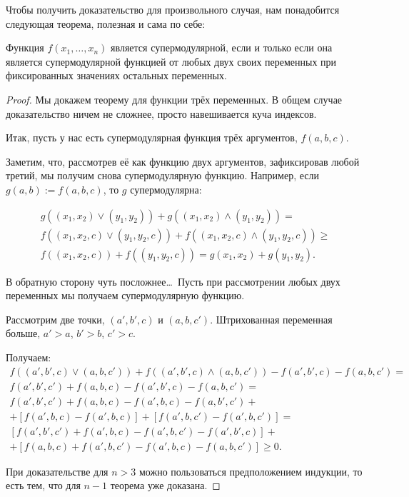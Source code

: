 Чтобы получить доказательство для произвольного случая, нам понадобится следующая теорема, полезная и сама по себе:
\begin{myth}
Функция $ f(x_{1},\ldots,x_{n}) $ является супермодулярной, если и только если она является супермодулярной функцией от любых двух своих переменных при фиксированных значениях остальных переменных.
\end{myth}

\begin{proof}

Мы докажем теорему для функции трёх переменных. В общем случае доказательство ничем не сложнее, просто навешивается куча индексов.

Итак, пусть у нас есть супермодулярная функция трёх аргументов, $ f(a,b,c) $.

Заметим, что, рассмотрев её как функцию двух аргументов, зафиксировав любой третий, мы получим снова супермодулярную функцию. Например, если $ g(a,b):=f(a,b,c) $, то $ g $ супермодулярна:

\begin{multline}
g((x_{1},x_{2})\vee (y_{1},y_{2}))+g((x_{1},x_{2})\wedge (y_{1},y_{2}))=\\
f((x_{1},x_{2},c)\vee (y_{1},y_{2},c))+f((x_{1},x_{2},c)\wedge (y_{1},y_{2},c))\geq \\
f((x_{1},x_{2},c))+f((y_{1},y_{2},c))=g(x_{1},x_{2})+g(y_{1},y_{2}).
\end{multline}

В обратную сторону чуть посложнее\ldots~Пусть при рассмотрении любых двух переменных мы получаем супермодулярную функцию.

Рассмотрим две точки, $(a',b',c) $ и $ (a,b,c') $. Штрихованная переменная больше, $ a'>a $, $ b'>b $, $ c'>c $.

Получаем:
\begin{multline}
f((a',b',c)\vee (a,b,c'))+f((a',b',c)\wedge (a,b,c'))-f(a',b',c)-f(a,b,c')=\\
f(a',b',c')+f(a,b,c)-f(a',b',c)-f(a,b,c')=\\
f(a',b',c')+f(a,b,c)-f(a',b,c)-f(a,b',c')+\\
+[f(a',b,c)-f(a',b,c)]+[f(a',b,c')-f(a',b,c')]=\\
[f(a',b',c')+f(a',b,c)-f(a',b,c')-f(a',b',c)]+\\
+[f(a,b,c)+f(a',b,c')-f(a',b,c)-f(a,b,c')]\geq 0.
\end{multline}

При доказательстве для $ n>3 $ можно пользоваться предположением индукции, то есть тем, что для $ n-1 $ теорема уже доказана.
\end{proof}

